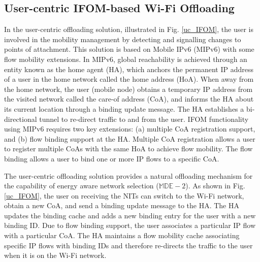 \documentclass[journal]{IEEEtran}
\begin{document}
\subsection{User-centric IFOM-based Wi-Fi Offloading}
In the user-centric offloading solution, illustrated in Fig. \ref{uc_IFOM}, the user is involved in the mobility management by detecting and signalling changes to points of attachment. This solution is based on Mobile IPv6 (MIPv6) \cite{rfc3775} with some flow mobility extensions. In MIPv6, global reachability is achieved through an entity known as the home agent (HA), which anchors the permanent IP address of a user in the home network called the home address (HoA). When away from the home network, the user (mobile node) obtains a temporary IP address from the visited network called the care-of address (CoA), and informs the HA about its current location through a binding update message. The HA establishes a bi-directional tunnel to re-direct traffic to and from the user. IFOM functionality using MIPv6 requires two key extensions: (a) multiple CoA registration support, and (b) flow binding support at the HA. Multiple CoA registration allows a user to register multiple CoAs with the same HoA to achieve flow mobility. The flow binding allows a user to bind one or more IP flows to a specific CoA. 

The user-centric offloading solution provides a natural offloading mechanism for the capability of energy aware network selection ($\mathbb{MDE}-2$). As shown in Fig. \ref{uc_IFOM}, the user on receiving the NITs can switch to the Wi-Fi network, obtain a new CoA, and send a binding update message to the HA. The HA updates the binding cache and adds a new binding entry for the user with a new binding ID. Due to flow binding support, the user associates  a particular IP flow with a particular CoA. The HA maintains a flow mobility cache associating specific IP flows with  binding IDs and therefore re-directs the traffic to the user when it is on the Wi-Fi network. 
\end{document}
